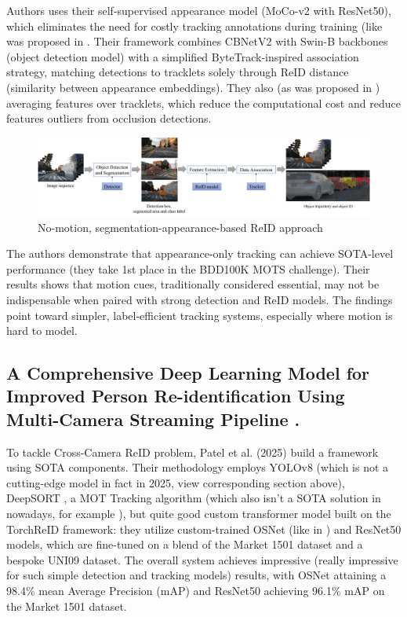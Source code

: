 \documentclass[12pt, a4paper]{article}
\begin{document}
Authors uses their self-supervised appearance model (MoCo-v2 with ResNet50), which eliminates the need for costly tracking annotations during training (like was proposed in \cite{ACAN}. Their framework combines  CBNetV2 with Swin-B backbones (object detection model) with a simplified ByteTrack-inspired \cite{ByteTrack} association strategy, matching detections to tracklets solely through ReID distance (similarity between appearance embeddings). They also (as was proposed in \cite{Specker-ReID}) averaging features over tracklets, which reduce the computational cost and reduce features outliers from occlusion detections.

\begin{figure}[h]
    \centering
    \includegraphics[width=0.95\linewidth]{pictures/no-motion-pipe}
    \caption{No-motion, segmentation-appearance-based ReID approach}
    \label{fig:no-motion-pipe}
\end{figure}

The authors demonstrate that appearance-only tracking can achieve SOTA-level performance (they take 1st place in the BDD100K MOTS challenge). Their results shows that motion cues, traditionally considered essential, may not be indispensable when paired with strong detection and ReID models. The findings point toward simpler, label-efficient tracking systems, especially where motion is hard to model.
 
\subsection{A Comprehensive Deep Learning Model for Improved Person Re-identification Using Multi-Camera Streaming Pipeline \cite{comp-dl-ReID}.}

To tackle Cross-Camera ReID problem, Patel et al. (2025) build a framework using SOTA components. Their methodology employs YOLOv8 \cite{yolov8} (which is not a cutting-edge model in fact in 2025, view corresponding section above), DeepSORT \cite{DeepSORT}, a MOT Tracking algorithm (which also isn't a SOTA solution in nowadays, for example \cite{ByteTrack, TransCenter, TransTrack, BoTsort, os-sort, StrongSORT}), but quite good custom transformer model built on the TorchReID framework: they utilize custom-trained OSNet (like in \cite{os-sort, deep-os-sort}) and ResNet50 models, which are fine-tuned on a blend of the Market 1501 dataset and a bespoke UNI09 dataset. The overall system achieves impressive (really impressive for such simple detection and tracking models) results, with OSNet attaining a 98.4\% mean Average Precision (mAP) and ResNet50 achieving 96.1\% mAP on the Market 1501 dataset.
\end{document}
